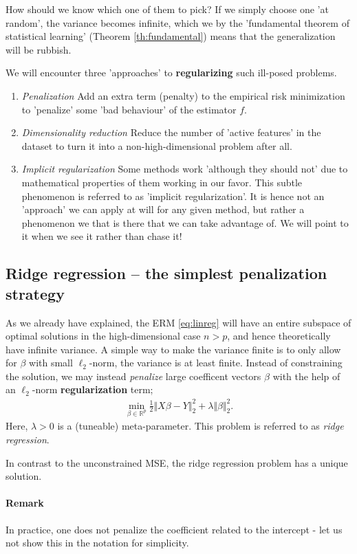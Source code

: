 \documentclass{article}
\newcommand{\R}{\mathbb{R}}
\newcommand{\norm}[1]{\Vert #1 \Vert}
\begin{document}
How should we know which one of them to pick? If we simply choose one 'at random', the variance becomes infinite, which we by the 'fundamental theorem of statistical learning' (Theorem \ref{th:fundamental}) means that the generalization will be rubbish.

We will encounter three 'approaches' to \textbf{regularizing} such ill-posed problems.
\begin{enumerate}
    \item \emph{Penalization} Add an extra term (penalty) to the empirical risk minimization to 'penalize' some 'bad behaviour' of the estimator $f$.
    \item \emph{Dimensionality reduction} Reduce the number of 'active features' in the dataset to turn it into a non-high-dimensional problem after all.
    \item \emph{Implicit regularization} Some methods work 'although they should not' due to mathematical properties of them working in our favor. This subtle phenomenon is referred to as 'implicit regularization'. It is hence not an 'approach' we can apply at will for any given method, but rather a phenomenon we that is there that we can take advantage of. We will point to it when we see it rather than chase it!
\end{enumerate}

\subsection{Ridge regression -- the simplest penalization strategy}
As we already have explained, the ERM \eqref{eq:linreg} will have an entire subspace of optimal solutions in the high-dimensional case $n>p$, and hence theoretically have infinite variance. A simple way to make the variance finite is to only allow for $\beta$ with small $\ell_2$-norm, the variance is at least finite. Instead of constraining the solution, we may instead \emph{penalize} large coefficent vectors $\beta$ with the help of an  $\ell_2$-norm \textbf{regularization} term;
\begin{align}
    \min_{\beta \in \R^p} \tfrac{1}{2}\norm{X\beta-Y}_2^2 + \lambda \norm{\beta}_2^2. \label{eq:ridgeregression}
\end{align}
Here, $\lambda>0$ is a (tuneable) meta-parameter. This problem is referred to  as \emph{ridge regression}.

In contrast to the unconstrained MSE, the ridge regression problem has a unique solution.

\paragraph{Remark} In practice, one does not penalize the coefficient related to the intercept - let us not show this in the notation for simplicity.
\end{document}
